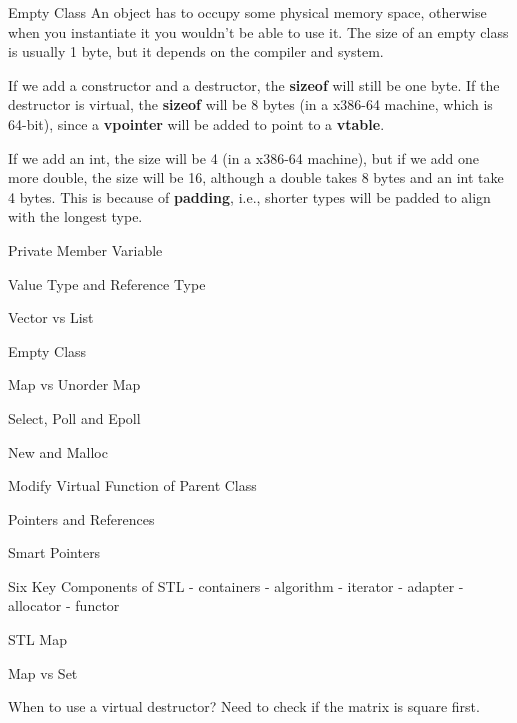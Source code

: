 \documentclass[oldfontcommands]{memoir}
\begin{document}
{\begin{answer}{Empty Class}
An object has to occupy some physical memory space, otherwise when you instantiate it you wouldn't be able to use it. The size of an empty class is usually 1 byte, but it depends on the compiler and system.

If we add a constructor and a destructor, the {\bf{sizeof}} will still be one byte. If the destructor is virtual, the {\bf{sizeof}} will be 8 bytes (in a x386-64 machine, which is 64-bit), since a {\bf{vpointer}} will be added to point to a {\bf{vtable}}.

If we add an int, the size will be 4 (in a x386-64 machine), but if we add one more double, the size will be 16, although a double takes 8 bytes and an int take 4 bytes. This is because of {\bf{padding}}, i.e., shorter types will be padded to align with the longest type.\end{answer}
\begin{answer}{Private Member Variable}
\end{answer}
\begin{answer}{Value Type and Reference Type}
\end{answer}
\begin{answer}{Vector vs List}
\end{answer}
\begin{answer}{Empty Class}
\end{answer}
\begin{answer}{Map vs Unorder Map}
\end{answer}
\begin{answer}{Select, Poll and Epoll}
\end{answer}
\begin{answer}{New and Malloc}
\end{answer}
\begin{answer}{Modify Virtual Function of Parent Class}

\end{answer}
\begin{answer}{Pointers and References}

\end{answer}
\begin{answer}{Smart Pointers}

\end{answer}
\begin{answer}{Six Key Components of STL}
- containers
- algorithm
- iterator
- adapter
- allocator
- functor \end{answer}
\begin{answer}{STL Map}
\end{answer}
\begin{answer}{Map vs Set}
\end{answer}
\begin{answer}{When to use a virtual destructor?}
Need to check if the matrix is square first.


\end{answer}}
\end{document}
